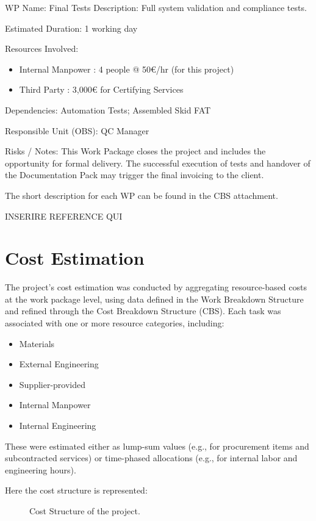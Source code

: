 WP Name: Final Tests
Description:
Full system validation and compliance tests.

Estimated Duration: 1 working day

Resources Involved:
\begin{itemize}
    \item  Internal Manpower : 4 people @ 50€/hr (for this project)
    \item  Third Party : 3,000€ for Certifying Services

\end{itemize}

Dependencies:
Automation Tests; Assembled Skid FAT

Responsible Unit (OBS): QC Manager

Risks / Notes:
This Work Package closes the project and includes the opportunity for formal delivery. The successful execution of tests and handover of the Documentation Pack may trigger the final invoicing to the client.

The short description for each WP can be found in the CBS attachment.

INSERIRE REFERENCE QUI

\section{Cost Estimation}

The project’s cost estimation was conducted by aggregating resource-based costs at the work package level, using data defined in the Work Breakdown Structure and refined through the Cost Breakdown Structure (CBS). Each task was associated with one or more resource categories, including:
\begin{itemize}
    \item Materials
    \item External Engineering
    \item Supplier-provided
    \item Internal Manpower
    \item Internal Engineering
\end{itemize}


These were estimated either as lump-sum values (e.g., for procurement items and subcontracted services) or time-phased allocations (e.g., for internal labor and engineering hours).

Here the cost structure is represented:

\begin{figure}[p]
    \centering
    \caption{Cost Structure of the project.}
    \label{fig:CS}
\end{figure}

